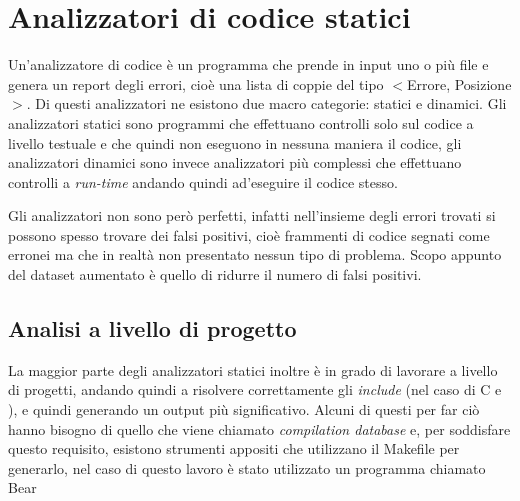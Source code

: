 

 


\section{Analizzatori di codice statici}
Un'analizzatore di codice è un programma che prende in input uno o più file e genera un report degli errori, cioè una lista di coppie del tipo $<$Errore, Posizione$>$. Di questi analizzatori ne esistono due macro categorie: statici e dinamici. 
Gli analizzatori statici sono programmi che effettuano controlli solo sul codice a livello testuale e che quindi non eseguono in nessuna maniera il codice, gli analizzatori dinamici sono invece analizzatori più complessi che effettuano controlli a \textit{run-time}
andando quindi ad'eseguire il codice stesso.

Gli analizzatori non sono però perfetti, infatti nell'insieme degli errori trovati si possono spesso trovare dei falsi positivi, cioè frammenti di codice segnati come erronei ma che in realtà non presentato nessun tipo di problema. Scopo appunto del dataset aumentato
è quello di ridurre il numero di falsi positivi.


\subsection{Analisi a livello di progetto} \label{subsec:compile_database}
La maggior parte degli analizzatori statici inoltre è in grado di lavorare a livello di progetti, andando quindi a risolvere correttamente gli \textit{include} (nel caso di C e \CPP), e quindi generando un output più significativo. 
Alcuni di questi per far ciò hanno bisogno di quello che viene chiamato \textit{compilation database} e, per soddisfare questo requisito, esistono strumenti appositi che utilizzano il Makefile per generarlo, nel caso di questo lavoro è stato utilizzato un programma
chiamato Bear


